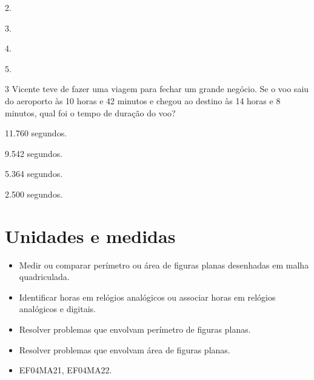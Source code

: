\begin{escolha}
\item
  2.
\item
  3.
\item
  4.
\item
  5.
\end{escolha}


\num{3} Vicente teve de fazer uma viagem para fechar um grande negócio. Se o voo
saiu do aeroporto às 10 horas e 42 minutos e chegou ao destino às 14
horas e 8 minutos, qual foi o tempo de duração do voo?

\begin{escolha}
\item
  11.760 segundos.
\item
  9.542 segundos.
\item
  5.364 segundos.
\item
  2.500 segundos.
\end{escolha}


\chapter{Unidades e medidas}


\begin{itemize}
\item Medir ou comparar perímetro ou área de figuras planas desenhadas em
malha quadriculada.
\item Identificar horas em relógios analógicos ou associar horas em relógios
analógicos e digitais.
\item Resolver problemas que envolvam perímetro de figuras planas.
\item Resolver problemas que envolvam área de figuras planas.
\end{itemize}


\begin{itemize}
\item EF04MA21, EF04MA22.
\end{itemize}


